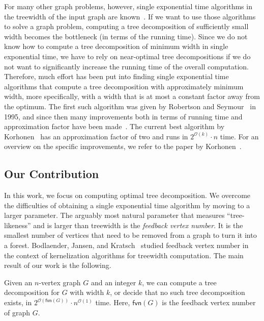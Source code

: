 \documentclass[a4paper,UKenglish,cleveref, autoref, thm-restate, numberwithinsect]{lipics-v2021}
\newcounter{algorithm}
\newcommand{\OO}{\mathcal{O}}
\newcommand{\fvn}{\mathsf{fvn}}
\begin{document}
For many other graph problems, however, single exponential time algorithms in the treewidth of the input graph are known~\cite{arnborg1989linear,Bodlaender88,bodlaender2015deterministic,bodlaender2008combinatorial,cygan2022solving,DF13,FG06,Nie06}.
If we want to use those algorithms to solve a graph problem, computing a tree decomposition of sufficiently small width becomes the bottleneck (in terms of the running time). Since we do not know how to compute a tree decomposition of minimum width in single exponential time, we have to rely on near-optimal tree decompositions if we do not want to significantly increase the running time of the overall computation. Therefore, much effort has been put into finding single exponential time algorithms that compute a tree decomposition with approximately minimum width, more specifically, with a width that is at most a constant factor away from the optimum. The first such algorithm was given by Robertson and Seymour~\cite{robertson1995graph} in 1995, and since then many improvements both in terms of running time and approximation factor have been made~\cite{amir2010approximation,BelbasiF21,BelbasiF22,bodlaender2016c,Korhonen23}. The current best algorithm by Korhonen~\cite{Korhonen23} has an approximation factor of two and runs in $2^{\OO(k)}\cdot n$ time. For an overview on the specific improvements, we refer to the paper by Korhonen~\cite{Korhonen23}.

\subsection{Our Contribution} In this work, we focus on computing optimal tree decomposition. We overcome the difficulties of obtaining a single exponential time algorithm by moving to a larger parameter. The arguably most natural parameter that measures ``tree-likeness'' and is larger than treewidth is the \emph{feedback vertex number}. It is the smallest number of vertices that need to be removed from a graph to turn it into a forest. 
Bodlaender, Jansen, and Kratsch~\cite{bodlaender2013preprocessing} studied feedback vertex number in the context of kernelization algorithms for treewidth computation.
The main result of our work is the following.

\begin{theorem}\label{thm:main}
    Given an $n$-vertex graph $G$ and an integer $k$, we can compute a tree decomposition for $G$ with width $k$, or decide that no such tree decomposition exists, in $2^{\OO(\fvn(G))}\cdot n^{\OO(1)}$ time. Here, $\fvn(G)$ is the feedback vertex number of graph $G$.
\end{theorem}
\end{document}

